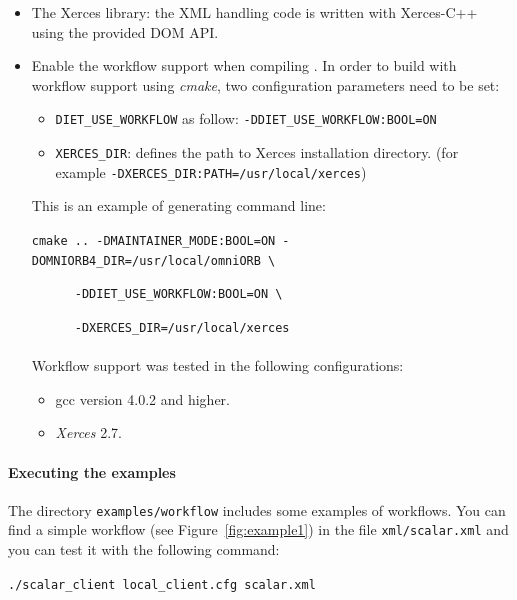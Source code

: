 \begin{itemize}
\item The Xerces library: the XML handling code is written with
  Xerces-C++ using the provided DOM API.
\item Enable the workflow support when compiling \diet. In order to build \diet with workflow support using \textit{cmake}, two
configuration parameters need to be set:

\begin{itemize}
\item \texttt{DIET\_USE\_WORKFLOW} as follow: \texttt{-DDIET\_USE\_WORKFLOW:BOOL=ON}
\item \texttt{XERCES\_DIR}: defines the path to Xerces installation directory.
  (for example \texttt{-DXERCES\_DIR:PATH=/usr/local/xerces})
\end{itemize}

This is an example of generating command line:

\verb|cmake .. -DMAINTAINER_MODE:BOOL=ON -DOMNIORB4_DIR=/usr/local/omniORB \|

\verb|      -DDIET_USE_WORKFLOW:BOOL=ON \|

\verb|      -DXERCES_DIR=/usr/local/xerces|


\paragraph{}
Workflow support was tested in the following configurations:

\begin{itemize}
\item gcc version 4.0.2 and higher.
\item \textit{Xerces} 2.7.
\end{itemize}
\end{itemize}

\paragraph{Executing the examples}

The directory \texttt{examples/workflow} includes some examples of
workflows.  You can find a simple workflow (see
Figure~\ref{fig:example1}) in the file \texttt{xml/scalar.xml} and you
can test it with the following command:

\verb|./scalar_client local_client.cfg scalar.xml |


